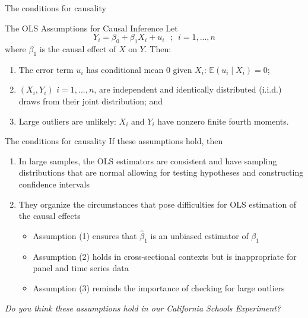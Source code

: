 \documentclass[notes,10pt, aspectratio=169]{beamer}
\begin{document}
\begin{frame}{The conditions for causality}
\begin{exampleblock}{The OLS Assumptions for Causal Inference}
Let
    \begin{equation*}
        Y_i  =  \beta_0 + \beta_1 X_i + u_i \text{~~;~~} i=1,...,n
    \end{equation*}
where $\beta_1$ is the causal effect of $X$ on $Y$. Then:
    \begin{enumerate}
        \item The error term $u_i$ has conditional mean $0$ given $X_i$: $\mathbb{E}(u_i\mid X_i)=0$;
        \item $(X_i, Y_i)$ $i=1,...,n$, are independent and identically distributed (i.i.d.) draws from their joint distribution; and
        \item Large outliers are unlikely: $X_i$ and $Y_i$ have nonzero finite fourth moments.
    \end{enumerate}
    
\end{exampleblock}
\end{frame}



\begin{frame}{The conditions for causality}
If these assumptions hold, then
\begin{enumerate}
    \item In large samples, the OLS estimators are consistent and have sampling distributions that are normal allowing for testing hypotheses and constructing confidence intervals
    \item They organize the circumstances that pose difficulties for OLS estimation of the causal effects
\begin{itemize}
    \item Assumption (1) ensures that $\hat{\beta}_1$ is an unbiased estimator of $\beta_1$
    \item Assumption (2) holds in cross-sectional contexts but is inappropriate for panel and time series data
    \item Assumption (3) reminds the importance of checking for large outliers
\end{itemize}
\end{enumerate}
\textit{Do you think these assumptions hold in our California Schools Experiment?}
\end{frame}
\end{document}
